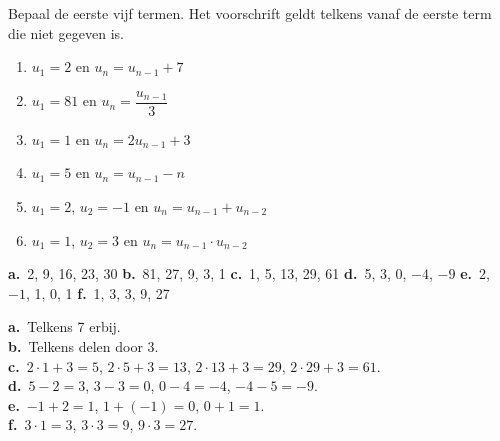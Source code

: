 \begin{oefeningen}
\begin{oefening}[1]\label{oef:h1-recterm}
Bepaal de eerste vijf termen. Het voorschrift geldt telkens vanaf de eerste term die niet gegeven is.
\begin{enumerate}
  \item $u_1 = 2$ en $u_n = u_{n-1} + 7$
  \item $u_1 = 81$ en $u_n = \dfrac{u_{n-1}}{3}$
  \item $u_1 = 1$ en $u_n = 2u_{n-1} + 3$
  \item $u_1 = 5$ en $u_n = u_{n-1} - n$
  \item $u_1 = 2$, $u_2 = -1$ en $u_n = u_{n-1} + u_{n-2}$
  \item $u_1 = 1$, $u_2 = 3$ en $u_n = u_{n-1} \cdot u_{n-2}$
\end{enumerate}
\begin{solution}
\textbf{a.}~2, 9, 16, 23, 30 \quad \textbf{b.}~81, 27, 9, 3, 1 \quad \textbf{c.}~1, 5, 13, 29, 61 \quad \textbf{d.}~5, 3, 0, $-4$, $-9$ \quad \textbf{e.}~2, $-1$, 1, 0, 1 \quad \textbf{f.}~1, 3, 3, 9, 27
\end{solution}
\begin{fullsolution}
\textbf{a.}~Telkens 7 erbij.\\
\textbf{b.}~Telkens delen door 3.\\
\textbf{c.}~$2\cdot 1+3=5$, $2\cdot 5+3=13$, $2\cdot 13+3=29$, $2\cdot 29+3=61$.\\
\textbf{d.}~$5-2=3$, $3-3=0$, $0-4=-4$, $-4-5=-9$.\\
\textbf{e.}~$-1+2=1$, $1+(-1)=0$, $0+1=1$.\\
\textbf{f.}~$3\cdot 1=3$, $3\cdot 3=9$, $9\cdot 3=27$.
\end{fullsolution}
\end{oefening}


\end{oefeningen}
